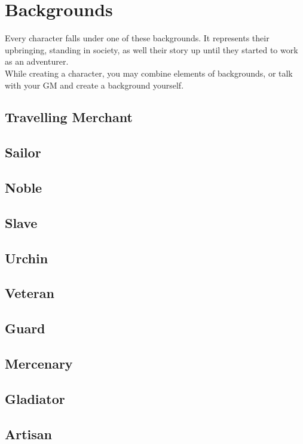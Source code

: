 \chapter{Backgrounds}
Every character falls under one of these backgrounds. It represents their upbringing, standing in society, as well their story up until they started to work as an adventurer. \\
While creating a character, you may combine elements of backgrounds, or talk with your GM and create a background yourself.\\

\section{Travelling Merchant}

\section{Sailor}

\section{Noble}

\section{Slave}

\section{Urchin}

\section{Veteran}

\section{Guard}

\section{Mercenary}

\section{Gladiator}

\section{Artisan}


